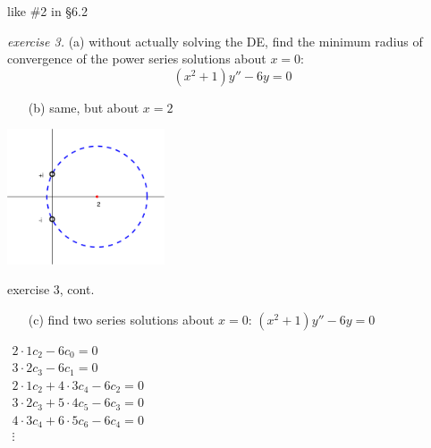 \documentclass[dvipsnames,colorlinks]{beamer}
\begin{document}
\begin{frame}{like \#2 in \S 6.2}

\noindent \emph{exercise 3.}  {\color{Blue} (a)} without actually solving the DE, find the minimum radius of convergence of the power series solutions about $x=0$:
  $$(x^2+1) y'' - 6 y = 0$$

\vspace{15mm}
\begin{itemize}
\item[(b)] same, but about $x=2$
\end{itemize}

\hfill \includegraphics[width=0.35\textwidth]{figs/minradius}
\end{frame}


\begin{frame}{exercise 3, cont.}

\begin{itemize}
\item[(c)] find two series solutions about $x=0$: \small\quad $(x^2+1) y'' - 6 y = 0$
\end{itemize}

\vspace{40mm}

\hfill \footnotesize $\displaystyle \boxed{\begin{matrix} 2\cdot 1 c_2 - 6 c_0 = 0 \\
                                     3\cdot 2 c_3 - 6 c_1 = 0 \\
                                     2\cdot 1 c_2 + 4\cdot 3 c_4 - 6 c_2 = 0 \\
                                     3\cdot 2 c_3 + 5\cdot 4 c_5 - 6 c_3 = 0 \\
                                     4\cdot 3 c_4 + 6\cdot 5 c_6 - 6 c_4 = 0 \\
                                      \vdots \\
                      \end{matrix}}$
\end{frame}
\end{document}
